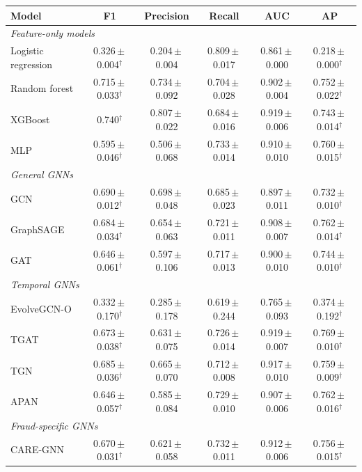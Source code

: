 \begin{tabular}{lccccc}
\toprule
Model & F1 & Precision & Recall & AUC & AP\\
\midrule
\multicolumn{6}{l}{\textit{Feature-only models}}\\
Logistic regression & 0.326\,$\pm$\,0.004$^{\dagger}$ & 0.204\,$\pm$\,0.004 & 0.809\,$\pm$\,0.017 & 0.861\,$\pm$\,0.000 & 0.218\,$\pm$\,0.000$^{\dagger}$\\
Random forest & 0.715\,$\pm$\,0.033$^{\dagger}$ & 0.734\,$\pm$\,0.092 & 0.704\,$\pm$\,0.028 & 0.902\,$\pm$\,0.004 & 0.752\,$\pm$\,0.022$^{\dagger}$\\
XGBoost & 0.740$^{\dagger}$ & 0.807\,$\pm$\,0.022 & 0.684\,$\pm$\,0.016 & 0.919\,$\pm$\,0.006 & 0.743\,$\pm$\,0.014$^{\dagger}$\\
MLP & 0.595\,$\pm$\,0.046$^{\dagger}$ & 0.506\,$\pm$\,0.068 & 0.733\,$\pm$\,0.014 & 0.910\,$\pm$\,0.010 & 0.760\,$\pm$\,0.015$^{\dagger}$\\
\multicolumn{6}{l}{\textit{General GNNs}}\\
GCN & 0.690\,$\pm$\,0.012$^{\dagger}$ & 0.698\,$\pm$\,0.048 & 0.685\,$\pm$\,0.023 & 0.897\,$\pm$\,0.011 & 0.732\,$\pm$\,0.010$^{\dagger}$\\
GraphSAGE & 0.684\,$\pm$\,0.034$^{\dagger}$ & 0.654\,$\pm$\,0.063 & 0.721\,$\pm$\,0.011 & 0.908\,$\pm$\,0.007 & 0.762\,$\pm$\,0.014$^{\dagger}$\\
GAT & 0.646\,$\pm$\,0.061$^{\dagger}$ & 0.597\,$\pm$\,0.106 & 0.717\,$\pm$\,0.013 & 0.900\,$\pm$\,0.010 & 0.744\,$\pm$\,0.010$^{\dagger}$\\
\multicolumn{6}{l}{\textit{Temporal GNNs}}\\
EvolveGCN-O & 0.332\,$\pm$\,0.170$^{\dagger}$ & 0.285\,$\pm$\,0.178 & 0.619\,$\pm$\,0.244 & 0.765\,$\pm$\,0.093 & 0.374\,$\pm$\,0.192$^{\dagger}$\\
TGAT & 0.673\,$\pm$\,0.038$^{\dagger}$ & 0.631\,$\pm$\,0.075 & 0.726\,$\pm$\,0.014 & 0.919\,$\pm$\,0.007 & 0.769\,$\pm$\,0.010$^{\dagger}$\\
TGN & 0.685\,$\pm$\,0.036$^{\dagger}$ & 0.665\,$\pm$\,0.070 & 0.712\,$\pm$\,0.008 & 0.917\,$\pm$\,0.010 & 0.759\,$\pm$\,0.009$^{\dagger}$\\
APAN & 0.646\,$\pm$\,0.057$^{\dagger}$ & 0.585\,$\pm$\,0.084 & 0.729\,$\pm$\,0.010 & 0.907\,$\pm$\,0.006 & 0.762\,$\pm$\,0.016$^{\dagger}$\\
\multicolumn{6}{l}{\textit{Fraud-specific GNNs}}\\
CARE-GNN & 0.670\,$\pm$\,0.031$^{\dagger}$ & 0.621\,$\pm$\,0.058 & 0.732\,$\pm$\,0.011 & 0.912\,$\pm$\,0.006 & 0.756\,$\pm$\,0.015$^{\dagger}$\\

\end{tabular}
